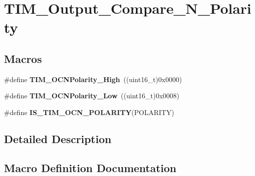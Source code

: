 \hypertarget{group___t_i_m___output___compare___n___polarity}{}\section{T\+I\+M\+\_\+\+Output\+\_\+\+Compare\+\_\+\+N\+\_\+\+Polarity}
\label{group___t_i_m___output___compare___n___polarity}
\subsection*{Macros}
\begin{DoxyCompactItemize}
\item 
\hypertarget{group___t_i_m___output___compare___n___polarity_gaa62288888d4f6858bee6b3cd9086ae3f}{}\#define {\bfseries T\+I\+M\+\_\+\+O\+C\+N\+Polarity\+\_\+\+High}~((uint16\+\_\+t)0x0000)\label{group___t_i_m___output___compare___n___polarity_gaa62288888d4f6858bee6b3cd9086ae3f}

\item 
\hypertarget{group___t_i_m___output___compare___n___polarity_ga9582560b2e7dae2e8dc3b65909b0c9cf}{}\#define {\bfseries T\+I\+M\+\_\+\+O\+C\+N\+Polarity\+\_\+\+Low}~((uint16\+\_\+t)0x0008)\label{group___t_i_m___output___compare___n___polarity_ga9582560b2e7dae2e8dc3b65909b0c9cf}

\item 
\#define {\bfseries I\+S\+\_\+\+T\+I\+M\+\_\+\+O\+C\+N\+\_\+\+P\+O\+L\+A\+R\+I\+T\+Y}(P\+O\+L\+A\+R\+I\+T\+Y)
\end{DoxyCompactItemize}


\subsection{Detailed Description}


\subsection{Macro Definition Documentation}
\hypertarget{group___t_i_m___output___compare___n___polarity_gad7385dee1d2b6ce0daf23ceaac4439cd}{}
